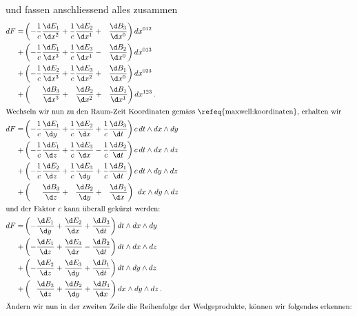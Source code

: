 und fassen anschliessend alles zusammen
\begin{align*}
	dF =
	&\left( - \frac{1}{c} \frac{\d E_1}{\d x^2} + \frac{1}{c} \frac{\d E_2}{\d x^1} + \phantom{\frac{1}{c}} \frac{\d B_3}{\d x^0} \right) dx^{012}
	\\
	+&\left( - \frac{1}{c} \frac{\d E_1}{\d x^3} + \frac{1}{c} \frac{\d E_3}{\d x^1} - \phantom{\frac{1}{c}} \frac{\d B_2}{\d x^0} \right) dx^{013}
	\\
	+&\left( - \frac{1}{c} \frac{\d E_2}{\d x^3} + \frac{1}{c} \frac{\d E_3}{\d x^2} + \phantom{\frac{1}{c}} \frac{\d B_1}{\d x^0} \right) dx^{023}
	\\
	+&\left( \phantom{+} \phantom{\frac{1}{c}} \frac{\d B_3}{\d x^3} + \phantom{\frac{1}{c}} \frac{\d B_2}{\d x^2} + \phantom{\frac{1}{c}} \frac{\d B_1}{\d x^1} \right) dx^{123} \, .
	\\
	\intertext{Wechseln wir nun zu den Raum-Zeit Koordinaten gemäss \refeq{maxwell:koordinaten}, erhalten wir}
	dF =
	&\left( - \frac{1}{c} \frac{\d E_1}{\d y} + \frac{1}{c} \frac{\d E_2}{\d x} + \frac{1}{c} \frac{\d B_3}{\d t} \right) c \, dt \wedge dx \wedge dy
	\\
	+&\left( - \frac{1}{c} \frac{\d E_1}{\d z} + \frac{1}{c} \frac{\d E_3}{\d x} - \frac{1}{c} \frac{\d B_2}{\d t} \right) c \, dt \wedge dx \wedge dz
	\\
	+&\left( - \frac{1}{c} \frac{\d E_2}{\d z} + \frac{1}{c} \frac{\d E_3}{\d y} + \frac{1}{c} \frac{\d B_1}{\d t} \right) c\, dt \wedge dy \wedge dz
	\\
	+&\left( \phantom{+} \phantom{\frac{1}{c}} \frac{\d B_3}{\d z} + \phantom{\frac{1}{c}} \frac{\d B_2}{\d y} + \phantom{\frac{1}{c}} \frac{\d B_1}{\d x} \right) \phantom{c} dx \wedge dy \wedge dz
	\\
	\intertext{und der Faktor $c$ kann überall gekürzt werden:}
	dF =
	&\left( -  \frac{\d E_1}{\d y} +  \frac{\d E_2}{\d x} +  \frac{\d B_3}{\d t} \right) dt \wedge dx \wedge dy
	\\
	+&\left( -  \frac{\d E_1}{\d z} +  \frac{\d E_3}{\d x} -  \frac{\d B_2}{\d t} \right)dt \wedge dx \wedge dz
	\\
	+&\left( -  \frac{\d E_2}{\d z} +  \frac{\d E_3}{\d y} +  \frac{\d B_1}{\d t} \right)dt \wedge dy \wedge dz
	\\
	+&\left( \phantom{+}  \frac{\d B_3}{\d z} +  \frac{\d B_2}{\d y} +  \frac{\d B_1}{\d x} \right) dx \wedge dy \wedge dz \, .
	\\
	\intertext{Ändern wir nun in der zweiten Zeile die Reihenfolge der Wedgeprodukte, können wir folgendes erkennen:}

\end{align*}
